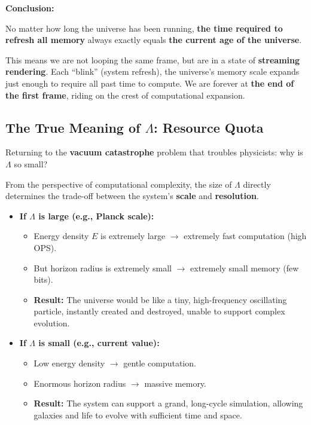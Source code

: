 \textbf{Conclusion:}

No matter how long the universe has been running, \textbf{the time required to refresh all memory} always exactly equals \textbf{the current age of the universe}.

This means we are not looping the same frame, but are in a state of \textbf{streaming rendering}. Each ``blink'' (system refresh), the universe's memory scale expands just enough to require all past time to compute. We are forever at \textbf{the end of the first frame}, riding on the crest of computational expansion.

\subsection{The True Meaning of $\Lambda$: Resource Quota}

Returning to the \textbf{vacuum catastrophe} problem that troubles physicists: why is $\Lambda$ so small?

From the perspective of computational complexity, the size of $\Lambda$ directly determines the trade-off between the system's \textbf{scale} and \textbf{resolution}.

\begin{itemize}
\item \textbf{If $\Lambda$ is large (e.g., Planck scale):}

    \begin{itemize}
    \item Energy density $E$ is extremely large $\to$ extremely fast computation (high OPS).

    \item But horizon radius is extremely small $\to$ extremely small memory (few bits).

    \item \textbf{Result:} The universe would be like a tiny, high-frequency oscillating particle, instantly created and destroyed, unable to support complex evolution.
    \end{itemize}

\item \textbf{If $\Lambda$ is small (e.g., current value):}

    \begin{itemize}
    \item Low energy density $\to$ gentle computation.

    \item Enormous horizon radius $\to$ massive memory.

    \item \textbf{Result:} The system can support a grand, long-cycle simulation, allowing galaxies and life to evolve with sufficient time and space.
    \end{itemize}
\end{itemize}


